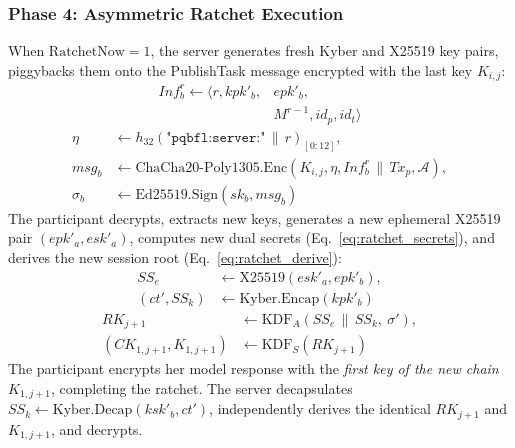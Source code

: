 \documentclass[journal, 10pt, twocolumn]{IEEEtran}
\begin{document}
\subsubsection{Phase 4: Asymmetric Ratchet Execution}
When $\text{RatchetNow}=1$, the server generates fresh Kyber and X25519 key pairs, piggybacks them onto the PublishTask message encrypted with the last key $K_{i,j}$:
\begin{equation}
\begin{split}
Inf_b^r \leftarrow \langle r, kpk'_b,& epk'_b, \\
                  & M^{r-1}, id_p, id_t \rangle
\end{split}
\label{eq:ratchet_info}
\end{equation}
\begin{equation}
\begin{split}
\eta &\leftarrow h_{32}(\texttt{"pqbfl:server:"} \,\|\, r)_{[0:12]}, \\
msg_b &\leftarrow \text{ChaCha20-Poly1305.Enc}(K_{i,j}, \eta, Inf_b^r \,\|\, Tx_p, \mathcal{A}), \\
\sigma_b &\leftarrow \text{Ed25519.Sign}(sk_b, msg_b)
\end{split}
\label{eq:ratchet_send}
\end{equation}
The participant decrypts, extracts new keys, generates a new ephemeral X25519 pair $(epk'_a, esk'_a)$, computes new dual secrets (Eq.~\eqref{eq:ratchet_secrets}), and derives the new session root (Eq.~\eqref{eq:ratchet_derive}):
\begin{equation}
\begin{split}
SS_e &\leftarrow \text{X25519}(esk'_a, epk'_b), \\
(ct', SS_k) &\leftarrow \text{Kyber.Encap}(kpk'_b)
\end{split}
\label{eq:ratchet_secrets}
\end{equation}
\begin{equation}
\begin{split}
RK_{j+1} &\leftarrow \text{KDF}_A(SS_e \,\|\, SS_k,\ \sigma'), \\
(CK_{1,j+1}, K_{1,j+1}) &\leftarrow \text{KDF}_S(RK_{j+1})
\end{split}
\label{eq:ratchet_derive}
\end{equation}
The participant encrypts her model response with the \textit{first key of the new chain} $K_{1,j+1}$, completing the ratchet. The server decapsulates $SS_k \leftarrow \text{Kyber.Decap}(ksk'_b, ct')$, independently derives the identical $RK_{j+1}$ and $K_{1,j+1}$, and decrypts.
\end{document}
